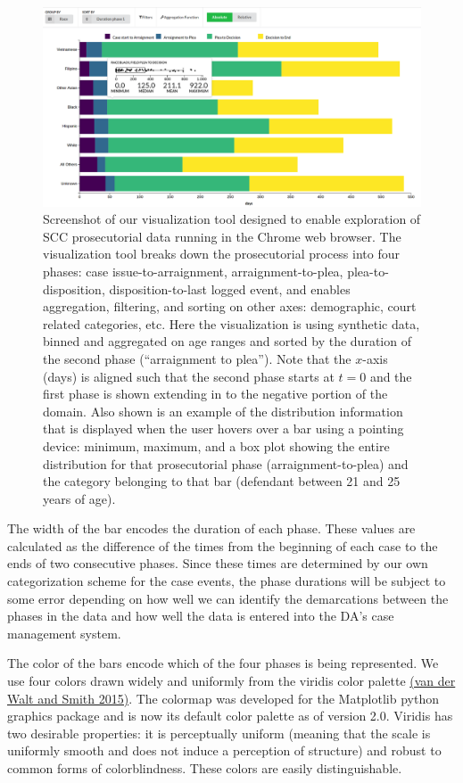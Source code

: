 \documentclass{AISB2008}
\begin{document}
\begin{figure}[h!]
\begin{center}
\includegraphics[width=0.70\columnwidth]{figures/sshot_original_original/sshot}
\caption{Screenshot of our visualization tool designed to enable exploration of SCC prosecutorial data running in the Chrome web browser. The visualization tool breaks down the prosecutorial process into four phases: case issue-to-arraignment, arraignment-to-plea, plea-to-disposition, disposition-to-last logged event, and enables aggregation, filtering, and sorting on other axes: demographic, court related categories, etc. Here the visualization is using synthetic data, binned and aggregated on age ranges and sorted by the duration of the second phase (``arraignment to plea''). Note that the $x$-axis (days) is aligned such that the second phase starts at $t = 0$ and the first phase is shown extending in to the negative portion of the domain. Also shown is an example of the distribution information that is displayed when the user hovers over a bar using a pointing device: minimum, maximum, and a box plot showing the entire distribution for that prosecutorial phase (arraignment-to-plea) and the category belonging to that bar (defendant between 21 and 25 years of age).
\label{fig:sshot}%
}
\end{center}
\end{figure}

The width of the bar encodes the duration of each phase. These values are calculated as the difference of the times from the beginning of each case to the ends of two consecutive phases. Since these times are determined by our own categorization scheme for the case events, the phase durations will be subject to some error depending on how well we can identify the demarcations between the phases in the data and how well the data is entered into the DA's case management system.

The color of the bars encode which of the four phases is being represented. We use four colors drawn widely and uniformly from the viridis color palette \hyperref[csl:3]{(van der Walt and Smith 2015)}. The colormap was developed for the Matplotlib python graphics package and is now its default color palette as of version 2.0. Viridis has two desirable properties: it is perceptually uniform (meaning that the scale is uniformly smooth and does not induce a perception of structure) and robust to common forms of colorblindness. These colors are easily distinguishable.
\end{document}

